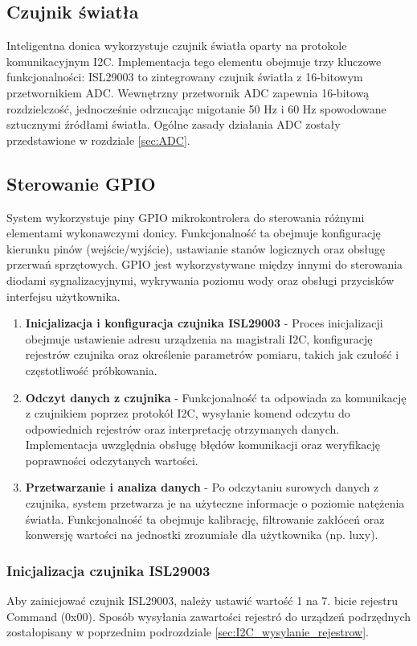 \documentclass{article}
\begin{document}
\subsection{Czujnik światła}
\label{sec:czujnik_swiatla}
Inteligentna donica wykorzystuje czujnik światła oparty na protokole komunikacyjnym I2C. Implementacja tego elementu obejmuje trzy kluczowe funkcjonalności:
ISL29003 to zintegrowany czujnik światła z 16-bitowym przetwornikiem ADC. Wewnętrzny przetwornik ADC zapewnia 16-bitową rozdzielczość, jednocześnie odrzucając migotanie 50 Hz i 60 Hz spowodowane sztucznymi źródłami światła. Ogólne zasady działania ADC zostały przedstawione w rozdziale \ref{sec:ADC}.
\subsection{Sterowanie GPIO}
System wykorzystuje piny GPIO mikrokontrolera do sterowania różnymi elementami wykonawczymi donicy. Funkcjonalność ta obejmuje konfigurację kierunku pinów (wejście/wyjście), ustawianie stanów logicznych oraz obsługę przerwań sprzętowych. GPIO jest wykorzystywane między innymi do sterowania diodami sygnalizacyjnymi, wykrywania poziomu wody oraz obsługi przycisków interfejsu użytkownika.

\begin{enumerate}
    \item \textbf{Inicjalizacja i konfiguracja czujnika ISL29003} - Proces inicjalizacji obejmuje ustawienie adresu urządzenia na magistrali I2C, konfigurację rejestrów czujnika oraz określenie parametrów pomiaru, takich jak czułość i częstotliwość próbkowania.

    \item \textbf{Odczyt danych z czujnika} - Funkcjonalność ta odpowiada za komunikację z czujnikiem poprzez protokół I2C, wysyłanie komend odczytu do odpowiednich rejestrów oraz interpretację otrzymanych danych. Implementacja uwzględnia obsługę błędów komunikacji oraz weryfikację poprawności odczytanych wartości.

    \item \textbf{Przetwarzanie i analiza danych} - Po odczytaniu surowych danych z czujnika, system przetwarza je na użyteczne informacje o poziomie natężenia światła. Funkcjonalność ta obejmuje kalibrację, filtrowanie zakłóceń oraz konwersję wartości na jednostki zrozumiałe dla użytkownika (np. luxy).
\end{enumerate}

\subsubsection{Inicjalizacja czujnika ISL29003}
    Aby zainicjować czujnik ISL29003, należy ustawić wartość 1 na 7. bicie rejestru Command (0x00). Sposób wysyłania zawartości rejestró do urządzeń podrzędnych zostałopisany w poprzednim podrozdziale \ref{sec:I2C_wysylanie_rejestrow}.
\end{document}
